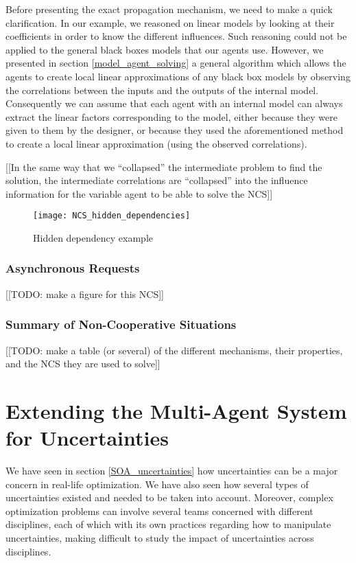 Before presenting the exact propagation mechanism, we need to make a quick clarification. In our example, we reasoned on linear models by looking at their coefficients in order to know the different influences. Such reasoning could not be applied to the general black boxes models that our agents use. However, we presented in section \ref{model_agent_solving} a general algorithm which allows the agents to create local linear approximations of any black box models by observing the correlations between the inputs and the outputs of the internal model. Consequently we can assume that each agent with an internal model can always extract the linear factors corresponding to the model, either because they were given to them by the designer, or because they used the aforementioned method to create a local linear approximation (using the observed correlations).

[[In the same way that we \enquote{collapsed} the intermediate problem to find the solution, the intermediate correlations are \enquote{collapsed} into the influence information for the variable agent to be able to solve the NCS]]

\begin{figure}
\centering
\texttt{[image: NCS\_hidden\_dependencies]}
\caption{Hidden dependency example}\label{NCS_hidden_dependencies}
\end{figure}

\subsection{Asynchronous Requests}

[[TODO: make a figure for this NCS]]

\subsection{Summary of Non-Cooperative Situations}

[[TODO: make a table (or several) of the different mechanisms, their properties, and the NCS they are used to solve]]

\chapter{Extending the Multi-Agent System for Uncertainties}

We have seen in section \ref{SOA_uncertainties} how uncertainties can be a major concern in real-life optimization. We have also seen how several types of uncertainties existed and needed to be taken into account. Moreover, complex optimization problems can involve several teams concerned with different disciplines, each of which with its own practices regarding how to manipulate uncertainties, making difficult to study the impact of uncertainties across disciplines.

